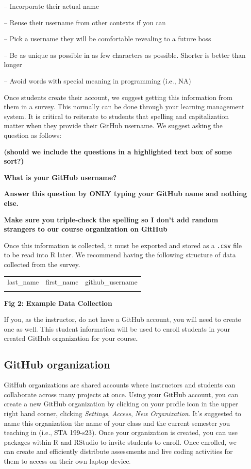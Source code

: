 \documentclass[
  12pt]{article}
\begin{document}
-- Incorporate their actual name

-- Reuse their username from other contexts if you can

-- Pick a username they will be comfortable revealing to a future boss

-- Be as unique as possible in as few characters as possible. Shorter is
better than longer

-- Avoid words with special meaning in programming (i.e., NA)

Once students create their account, we suggest getting this information
from them in a survey. This normally can be done through your learning
management system. It is critical to reiterate to students that spelling
and capitalization matter when they provide their GitHub username. We
suggest asking the question as follows:

\textbf{(should we include the questions in a highlighted text box of
some sort?)}

\textbf{What is your GitHub username?}

\textbf{Answer this question by ONLY typing your GitHub name and nothing
else.}

\textbf{Make sure you triple-check the spelling so I don't add random
strangers to our course organization on GitHub}

Once this information is collected, it must be exported and stored as a
\texttt{.csv} file to be read into R later. We recommend having the
following structure of data collected from the survey.

\begin{longtable}[]{@{}lll@{}}
\toprule()
\endhead
last\_name & first\_name & github\_username \\
& & \\
\bottomrule()
\end{longtable}

\textbf{Fig 2: Example Data Collection}

If you, as the instructor, do not have a GitHub account, you will need
to create one as well. This student information will be used to enroll
students in your created GitHub organization for your course.

\hypertarget{github-organization}{%
\subsection{GitHub organization}\label{github-organization}}

GitHub organizations are shared accounts where instructors and students
can collaborate across many projects at once. Using your GitHub account,
you can create a new GitHub organization by clicking on your profile
icon in the upper right hand corner, clicking \emph{Settings},
\emph{Access}, \emph{New Organization}. It's suggested to name this
organization the name of your class and the current semester you
teaching in (i.e., STA 199-s23). Once your organization is created, you
can use packages within R and RStudio to invite students to enroll. Once
enrolled, we can create and efficiently distribute assessments and live
coding activities for them to access on their own laptop device.
\end{document}
